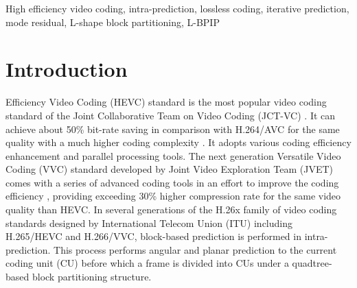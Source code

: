 \documentclass[journal]{IEEEtran}
\begin{document}
\begin{IEEEkeywords}
    High efficiency video coding, intra-prediction, lossless coding, iterative prediction, mode residual, L-shape block partitioning, L-BPIP
\end{IEEEkeywords}




%
\IEEEpeerreviewmaketitle


\section{Introduction}
% 
% 
% 
% 
 Efficiency Video Coding (HEVC) standard is the most popular video coding standard of the Joint Collaborative Team on Video Coding (JCT-VC) \cite{01}. It can achieve about 50\% bit-rate saving in comparison with H.264/AVC \cite{02} for the same quality with a much higher coding complexity \cite{03}. It adopts various coding efficiency enhancement and parallel processing tools. The next generation Versatile Video Coding (VVC) \cite{a} standard developed by Joint Video Exploration Team (JVET) comes with a series of advanced coding tools in an effort to improve the coding efficiency \cite{b}, providing exceeding 30\% higher compression rate for the same video quality than HEVC. In several generations of the H.26x family of video coding standards designed by International Telecom Union (ITU) including H.265/HEVC and H.266/VVC, block-based prediction is performed in intra-prediction. This process performs angular and planar prediction to the current coding unit (CU) before which a frame is divided into CUs under a quadtree-based block partitioning structure.
\end{document}
